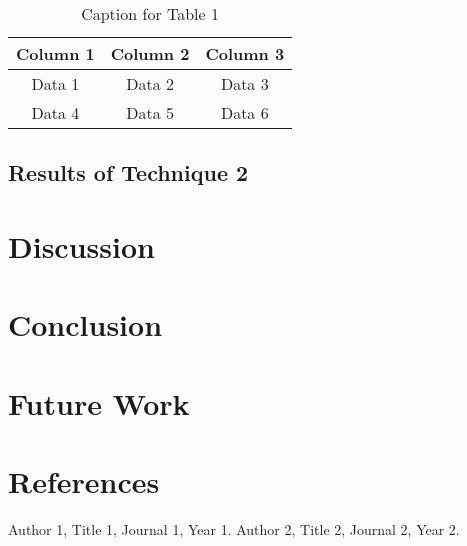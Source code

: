 \documentclass[11pt]{article}
\begin{document}
    \begin{table}[H]
        \centering
        \begin{tabular}{ccc}
            \toprule
            Column 1 & Column 2 & Column 3 \\
            \midrule
            Data 1   & Data 2   & Data 3   \\
            Data 4   & Data 5   & Data 6   \\
            \bottomrule
        \end{tabular}
        \caption{Caption for Table 1}
        \label{tab:table1}
    \end{table}

    \subsection{Results of Technique 2}
    \label{subsec:results2}
    \lipsum[16] %

    \section{Discussion}
    \label{sec:discussion}
    \lipsum[17-18] %

    \section{Conclusion}
    \label{sec:conclusion}
    \lipsum[19] %

    \section{Future Work}
    \label{sec:future}
    \lipsum[20] %

    \section*{References}
    \label{sec:references}
    \begin{thebibliography}{99}
         Author 1, Title 1, Journal 1, Year 1.
         Author 2, Title 2, Journal 2, Year 2.
    \end{thebibliography}
\end{document}
